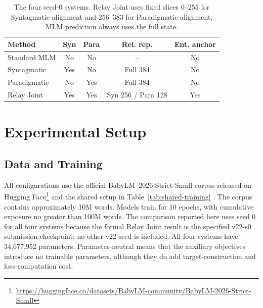\documentclass[11pt,a4paper]{article}
\newcommand{\standardmlm}{Standard MLM}
\newcommand{\syntagmatic}{Syntagmatic}
\newcommand{\paradigmatic}{Paradigmatic}
\newcommand{\relayjoint}{Relay Joint}
\begin{document}
\begin{table}[t]
\centering
\footnotesize
\setlength{\tabcolsep}{1.8pt}
\begin{tabular}{lcccc}
\toprule
Method & Syn & Para & Rel. rep. & Ent. anchor \\
\midrule
\standardmlm & No & No & -- & No \\
\syntagmatic & Yes & No & Full 384 & No \\
\paradigmatic & No & Yes & Full 384 & No \\
\relayjoint & Yes & Yes & Syn 256 / Para 128 & Yes \\
\bottomrule
\end{tabular}
\caption{The four seed-0 systems. Relay Joint uses fixed slices
0--255 for Syntagmatic alignment and 256--383 for Paradigmatic
alignment; MLM prediction always uses the full state.}
\label{tab:schedule}
\end{table}

\section{Experimental Setup}

\subsection{Data and Training}
\label{sec:data-training}

All configurations use the official BabyLM~2026 Strict-Small corpus
released on Hugging Face\footnote{\url{https://huggingface.co/datasets/BabyLM-community/BabyLM-2026-Strict-Small}}
and the shared setup in Table~\ref{tab:shared-training}
\citep{choshen2026babylmturns4papers}. The corpus contains approximately
10M words. Models train for 10 epochs, with cumulative exposure no
greater than 100M words. The comparison reported here uses seed 0 for
all four systems because the formal Relay Joint result is the specified
v22-s0 submission checkpoint; no other v22 seed is included. All four
systems have 34,677,952 parameters. Parameter-neutral means that the
auxiliary objectives introduce no trainable parameters, although they
do add target-construction and loss-computation cost.
\end{document}
